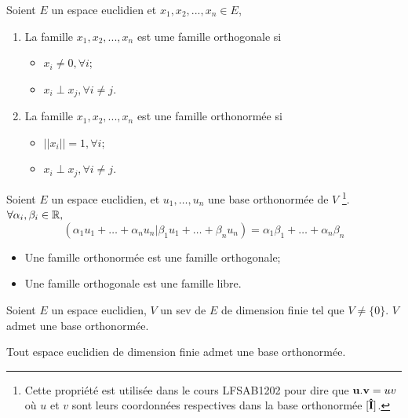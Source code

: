 \begin{mydef}
	Soient $E$ un espace euclidien et $x_1, x_2,... ,x_n \in E$,
	\begin{enumerate}
		\item La famille $x_1, x_2,... ,x_n$ est ume famille orthogonale si
			\begin{itemize}
				\item $x_i \neq 0, \forall i$;
				\item $x_i \perp x_j, \forall i \neq j$.
			\end{itemize}

		\item La famille $x_1, x_2,... ,x_n$ est une famille orthonormée si
			\begin{itemize}
				\item $||x_i|| = 1, \forall i$;
				\item $x_i \perp x_j, \forall i \neq j$.
			\end{itemize}
	\end{enumerate}
\end{mydef}

\begin{myprop}
	Soient $E$ un espace euclidien, et $u_1, \ldots, u_n$ une base orthonormée de $V$
	\footnote{Cette propriété est utilisée dans le cours LFSAB1202 pour dire que ${\bf u}.{\bf v} = uv$
	où $u$ et $v$ sont leurs coordonnées respectives dans la base orthonormée $[{\bf\hat{I}}]$.}.
	$\forall \alpha_i, \beta_i \in \mathbb{R},$
	$$(\alpha_1u_1 + \ldots + \alpha_nu_n | \beta_1u_1 + \ldots + \beta_nu_n) = \alpha_1\beta_1 + \ldots + \alpha_n\beta_n$$
\end{myprop}

\begin{myprop}\InsertTheoremBreak
	\begin{itemize}
		\item Une famille orthonormée est une famille orthogonale;
		\item Une famille orthogonale est une famille libre.
	\end{itemize}
\end{myprop}

\begin{myprop}
	Soient $E$ un espace euclidien, $V$ un sev de $E$ de dimension finie tel que $V \neq \{0\}$. $V$ admet une base orthonormée.
\end{myprop}

\begin{mycorr}
	Tout espace euclidien de dimension finie admet une base orthonormée.
\end{mycorr}

